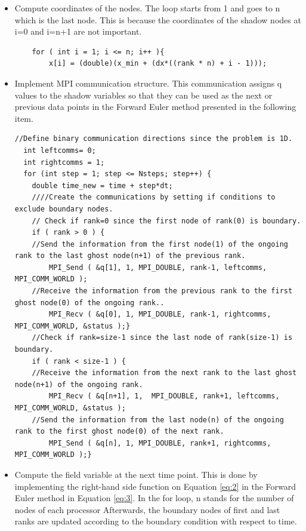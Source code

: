 \documentclass[12pt]{article}
\begin{document}
\begin{itemize}
    \item Compute coordinates of the nodes. The loop starts from 1 and goes to n which is the last node. This is because the coordinates of the shadow nodes at i=0 and i=n+1 are not important.
    \begin{verbatim}
    for ( int i = 1; i <= n; i++ ){
        x[i] = (double)(x_min + (dx*((rank * n) + i - 1)));
    \end{verbatim}
    \item Implement MPI communication structure. This communication assigns q values to the shadow variables so that they can be used as the next or previous data points in the Forward Euler method presented in the following item.
\begin{verbatim}
//Define binary communication directions since the problem is 1D.
  int leftcomms= 0;
  int rightcomms = 1;
  for (int step = 1; step <= Nsteps; step++) {
    double time_new = time + step*dt; 
    ////Create the communications by setting if conditions to exclude boundary nodes.
    // Check if rank=0 since the first node of rank(0) is boundary.
    if ( rank > 0 ) {
    //Send the information from the first node(1) of the ongoing rank to the last ghost node(n+1) of the previous rank.
        MPI_Send ( &q[1], 1, MPI_DOUBLE, rank-1, leftcomms, MPI_COMM_WORLD );
    //Receive the information from the previous rank to the first ghost node(0) of the ongoing rank..
        MPI_Recv ( &q[0], 1, MPI_DOUBLE, rank-1, rightcomms, MPI_COMM_WORLD, &status );}
    //Check if rank=size-1 since the last node of rank(size-1) is boundary.
    if ( rank < size-1 ) {
    //Receive the information from the next rank to the last ghost node(n+1) of the ongoing rank.
        MPI_Recv ( &q[n+1], 1,  MPI_DOUBLE, rank+1, leftcomms, MPI_COMM_WORLD, &status );
    //Send the information from the last node(n) of the ongoing rank to the first ghost node(0) of the next rank.
        MPI_Send ( &q[n], 1, MPI_DOUBLE, rank+1, rightcomms, MPI_COMM_WORLD );}
\end{verbatim}
    \item Compute the field variable at the next time point. This is done by implementing the right-hand side function on Equation \ref{eq:2} in the Forward Euler method in Equation \ref{eq:3}. In the for loop, n stands for the number of nodes of each processor Afterwards, the boundary nodes of first and last ranks are updated according to the boundary condition with respect to time.

\end{itemize}
\end{document}
